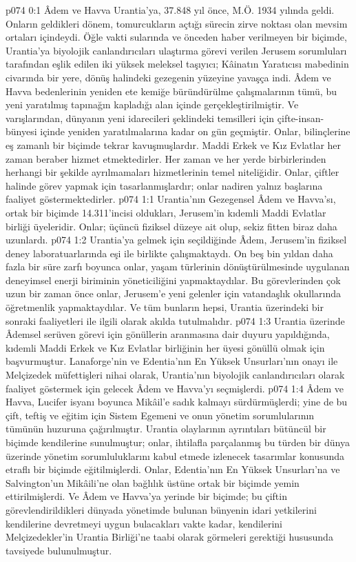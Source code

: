 \vs p074 0:1 Âdem ve Havva Urantia’ya, 37.848 yıl önce, M.Ö. 1934 yılında geldi. Onların geldikleri dönem, tomurcukların açtığı sürecin zirve noktası olan mevsim ortaları içindeydi. Öğle vakti sularında ve önceden haber verilmeyen bir biçimde, Urantia’ya biyolojik canlandırıcıları ulaştırma görevi verilen Jerusem sorumluları tarafından eşlik edilen iki yüksek meleksel taşıyıcı; Kâinatın Yaratıcısı mabedinin civarında bir yere, dönüş halindeki gezegenin yüzeyine yavaşça indi. Âdem ve Havva bedenlerinin yeniden ete kemiğe büründürülme çalışmalarının tümü, bu yeni yaratılmış tapınağın kapladığı alan içinde gerçekleştirilmiştir. Ve varışlarından, dünyanın yeni idarecileri şeklindeki temsilleri için çifte\hyp{}insan\hyp{}bünyesi içinde yeniden yaratılmalarına kadar on gün geçmiştir. Onlar, bilinçlerine eş zamanlı bir biçimde tekrar kavuşmuşlardır. Maddi Erkek ve Kız Evlatlar her zaman beraber hizmet etmektedirler. Her zaman ve her yerde birbirlerinden herhangi bir şekilde ayrılmamaları hizmetlerinin temel niteliğidir. Onlar, çiftler halinde görev yapmak için tasarlanmışlardır; onlar nadiren yalnız başlarına faaliyet göstermektedirler.
\vs p074 1:1 Urantia’nın Gezegensel Âdem ve Havva’sı, ortak bir biçimde 14.311’incisi oldukları, Jerusem’in kıdemli Maddi Evlatlar birliği üyeleridir. Onlar; üçüncü fiziksel düzeye ait olup, sekiz fitten biraz daha uzunlardı.
\vs p074 1:2 Urantia’ya gelmek için seçildiğinde Âdem, Jerusem’in fiziksel deney laboratuarlarında eşi ile birlikte çalışmaktaydı. On beş bin yıldan daha fazla bir süre zarfı boyunca onlar, yaşam türlerinin dönüştürülmesinde uygulanan deneyimsel enerji biriminin yöneticiliğini yapmaktaydılar. Bu görevlerinden çok uzun bir zaman önce onlar, Jerusem’e yeni gelenler için vatandaşlık okullarında öğretmenlik yapmaktaydılar. Ve tüm bunların hepsi, Urantia üzerindeki bir sonraki faaliyetleri ile ilgili olarak akılda tutulmalıdır.
\vs p074 1:3 Urantia üzerinde Âdemsel serüven görevi için gönüllerin aranmasına dair duyuru yapıldığında, kıdemli Maddi Erkek ve Kız Evlatlar birliğinin her üyesi gönüllü olmak için başvurmuştur. Lanaforge’nin ve Edentia’nın En Yüksek Unsurları’nın onayı ile Melçizedek müfettişleri nihai olarak, Urantia’nın biyolojik canlandırıcıları olarak faaliyet göstermek için gelecek Âdem ve Havva’yı seçmişlerdi.
\vs p074 1:4 Âdem ve Havva, Lucifer isyanı boyunca Mikâil’e sadık kalmayı sürdürmüşlerdi; yine de bu çift, teftiş ve eğitim için Sistem Egemeni ve onun yönetim sorumlularının tümünün huzuruna çağırılmıştır. Urantia olaylarının ayrıntıları bütüncül bir biçimde kendilerine sunulmuştur; onlar, ihtilafla parçalanmış bu türden bir dünya üzerinde yönetim sorumluluklarını kabul etmede izlenecek tasarımlar konusunda etraflı bir biçimde eğitilmişlerdi. Onlar, Edentia’nın En Yüksek Unsurları’na ve Salvington’un Mikâili’ne olan bağlılık üstüne ortak bir biçimde yemin ettirilmişlerdi. Ve Âdem ve Havva’ya yerinde bir biçimde; bu çiftin görevlendirildikleri dünyada yönetimde bulunan bünyenin idari yetkilerini kendilerine devretmeyi uygun bulacakları vakte kadar, kendilerini Melçizedekler’in Urantia Birliği’ne taabi olarak görmeleri gerektiği hususunda tavsiyede bulunulmuştur.
